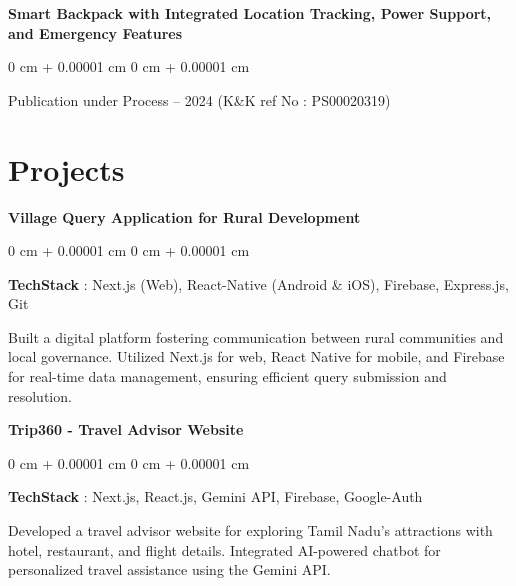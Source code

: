 \documentclass[10pt, letterpaper]{article}
\newenvironment{onecolentry}{
    \begin{adjustwidth}{
        0 cm + 0.00001 cm
    }{
        0 cm + 0.00001 cm
    }
}{
    \end{adjustwidth}
} %
\begin{document}
         \vspace{0.3 cm}

         \begin{samepage}
     \textbf{Smart Backpack with Integrated Location Tracking, Power Support, and Emergency Features  }
      \vspace{0.05 cm}
      
      \begin{onecolentry}
               Publication under Process – 2024 (K\&K ref No : PS00020319)  
               
               \vspace{0.05 cm}
        \end{onecolentry}
        \end{samepage}

          
   \section{Projects}
   \begin{samepage}
                \textbf{Village Query Application for Rural Development    }
            \vspace{0.05 cm}
            
            \begin{onecolentry}
               \textbf{TechStack} :  Next.js (Web), React-Native (Android \& iOS), Firebase, Express.js, Git  

                \vspace{0.05 cm}
                Built a digital platform fostering communication between rural communities and local governance. Utilized Next.js for web, React Native for mobile, and Firebase for real-time data management, ensuring efficient query submission and resolution.  
        \end{onecolentry}
        \end{samepage}
        \vspace{0.3cm}
        \begin{samepage}
                \textbf{Trip360 - Travel Advisor Website      }
            \vspace{0.05 cm}
            
            \begin{onecolentry}
               \textbf{TechStack} : Next.js, React.js, Gemini API, Firebase, Google-Auth  
               
                \vspace{0.05 cm}
               Developed a travel advisor website for exploring Tamil Nadu’s attractions with hotel, restaurant, and flight details. Integrated AI-powered chatbot for personalized travel assistance using the Gemini API.  
        \end{onecolentry}
        \end{samepage}
\end{document}
